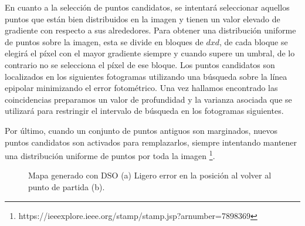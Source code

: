 En cuanto a la selección de puntos candidatos, se intentará seleccionar aquellos puntos que están bien distribuidos en la imagen y tienen un valor elevado de gradiente con respecto a sus alrededores. Para obtener una distribución uniforme de puntos sobre la imagen, esta se divide en bloques de $dxd$, de cada bloque se elegirá el píxel con el mayor gradiente siempre y cuando supere un umbral, de lo contrario no se selecciona el píxel de ese bloque. Los puntos candidatos son localizados en los siguientes fotogramas utilizando una búsqueda sobre la línea epipolar minimizando el error fotométrico. Una vez hallamos encontrado las coincidencias preparamos un valor de profundidad y la varianza asociada que se utilizará para restringir el intervalo de búsqueda en los fotogramas siguientes. 

Por último, cuando un conjunto de puntos antiguos son marginados, nuevos puntos candidatos son activados para remplazarlos, siempre intentando mantener una distribución uniforme de puntos por toda la imagen \footnote{https://ieeexplore.ieee.org/stamp/stamp.jsp?arnumber=7898369}.

\begin{figure}[H]
\begin{center}
\hspace{0.5cm}
\end{center}
\caption{Mapa generado con DSO (a) Ligero error en la posición al volver al punto de partida (b).}
\end{figure}

